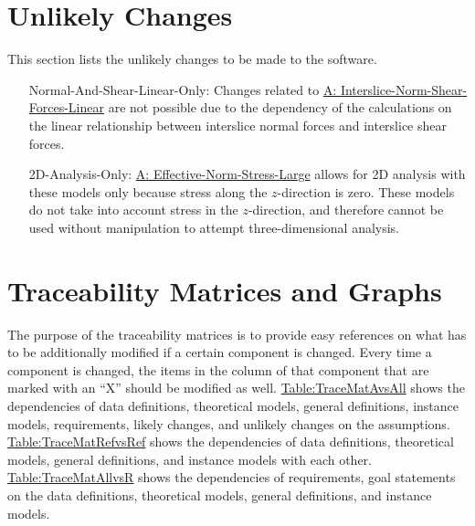 \documentclass[12pt]{article}
\begin{document}
\section{Unlikely Changes}
\label{Sec:UCs}
This section lists the unlikely changes to be made to the software.

\begin{itemize}
\item[Normal-And-Shear-Linear-Only:\phantomsection\label{UC_normshearlinear}]{Changes related to \hyperref[assumpINSFL]{A: Interslice-Norm-Shear-Forces-Linear} are not possible due to the dependency of the calculations on the linear relationship between interslice normal forces and interslice shear forces.}
\item[2D-Analysis-Only:\phantomsection\label{UC_2donly}]{\hyperref[assumpENSL]{A: Effective-Norm-Stress-Large} allows for 2D analysis with these models only because stress along the $z$-direction is zero. These models do not take into account stress in the $z$-direction, and therefore cannot be used without manipulation to attempt three-dimensional analysis.}
\end{itemize}
\section{Traceability Matrices and Graphs}
\label{Sec:TraceMatrices}
The purpose of the traceability matrices is to provide easy references on what has to be additionally modified if a certain component is changed. Every time a component is changed, the items in the column of that component that are marked with an ``X'' should be modified as well. \hyperref[Table:TraceMatAvsAll]{Table:TraceMatAvsAll} shows the dependencies of data definitions, theoretical models, general definitions, instance models, requirements, likely changes, and unlikely changes on the assumptions. \hyperref[Table:TraceMatRefvsRef]{Table:TraceMatRefvsRef} shows the dependencies of data definitions, theoretical models, general definitions, and instance models with each other. \hyperref[Table:TraceMatAllvsR]{Table:TraceMatAllvsR} shows the dependencies of requirements, goal statements on the data definitions, theoretical models, general definitions, and instance models.
\end{document}
